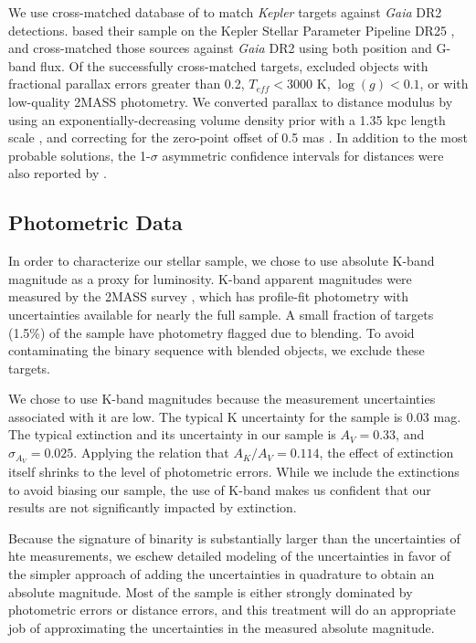 \documentclass[manuscript]{aastex6}
\newcommand{\Kepler}{\mbox{\textit{Kepler}}}
\newcommand{\Gaia}{\mbox{\textit{Gaia}}}
\newcommand{\Teff}{\ensuremath{T_{eff}}}
\newcommand{\logg}{\ensuremath{\log(g)}}
\newcommand{\gvs}{\authorcomment1}
\begin{document}

We use  cross-matched database of \citet{Berger18b} to match \Kepler{} targets
against \Gaia{} DR2 detections.
\citet{Berger18b} based their sample on the Kepler Stellar Parameter Pipeline
DR25 \citep{Mathur17}, and cross-matched those sources against \Gaia{} DR2
using both position and G-band flux. Of the successfully cross-matched targets,
\citet{Berger18b} excluded objects with fractional parallax errors greater than
0.2, \(\Teff < 3000\) K, \(\logg < 0.1\), or with low-quality 2MASS photometry. 
We converted parallax to distance modulus by using an
exponentially-decreasing volume density prior with a 1.35 kpc length scale
\citep{BailerJones15,Astraatmadja16}, and correcting for the zero-point offset
of 0.5 mas \citep{Zinn18}. \gvs{Should we include a table of this?} In 
addition to the most probable solutions, the 1-\(\sigma\) asymmetric 
confidence intervals for distances were also reported by \citet{Berger18b}.

\subsection{Photometric Data}

In order to characterize our stellar sample, we chose to use absolute K-band
magnitude as a proxy for luminosity. K-band apparent magnitudes were measured
by the 2MASS survey \citep{Skrutskie06}, which has profile-fit photometry with 
uncertainties available for nearly the full sample. A small fraction of 
targets (1.5\%) of the \citet{McQuillan14} sample have photometry flagged due
to blending. To avoid contaminating the binary sequence with blended objects,
we exclude these targets.

We chose to use K-band magnitudes because the measurement uncertainties
associated with it are low. The typical K uncertainty for the
\citep{McQuillan14} sample is 0.03 mag. The typical extinction and its
uncertainty in our sample is \(A_V = 0.33\), and \(\sigma_{A_V}=0.025\).
Applying the \citet{Cardelli89} relation that \(A_K/A_V = 0.114\), the effect
of extinction itself shrinks to the level of photometric errors. While we
include the extinctions to avoid biasing our sample, the use of K-band makes us
confident that our results are not significantly impacted by extinction.

Because the signature of binarity is substantially larger than the
uncertainties of hte measurements, we eschew detailed modeling of the
uncertainties in favor of the simpler approach of adding the uncertainties in
quadrature to obtain an absolute magnitude. Most of the sample is either
strongly dominated by photometric errors or distance errors, and this treatment
will do an appropriate job of approximating the uncertainties in the measured
absolute magnitude.
\end{document}
